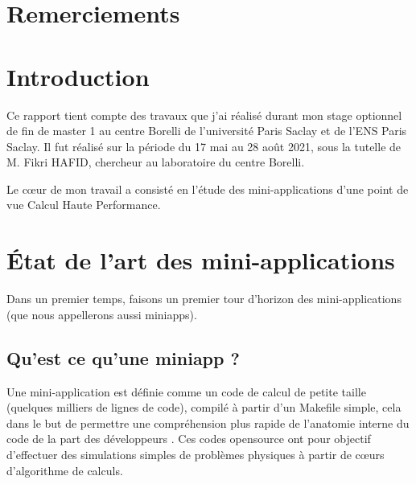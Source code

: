 \documentclass[11pt,a4paper,oneside]{memoir}
\theoremstyle{definition}
\theoremstyle{remark}
\theoremstyle{plain}
\begin{document}
\newpage
\tableofcontents



\begin{vplace}[0.5]

\chapter*{Remerciements}





\chapter*{Introduction}

Ce rapport tient compte des travaux que j'ai réalisé durant mon stage optionnel de fin de master 1 au centre Borelli de l'université Paris Saclay et de l'ENS Paris Saclay. Il fut réalisé sur la période du 17 mai au 28 août 2021, sous la tutelle de M. Fikri HAFID, chercheur au laboratoire du centre Borelli. \bigskip
~\bigskip


Le cœur de mon travail a consisté en l'étude des mini-applications d'une point de vue Calcul Haute Performance.



\end{vplace}







\newpage


\chapter{\'Etat de l'art des mini-applications}

Dans un premier temps, faisons un premier tour d'horizon des mini-applications (que nous appellerons aussi miniapps).

\section{Qu'est ce qu'une miniapp ?}

Une mini-application est définie comme un code de calcul de petite taille (quelques milliers de lignes de code), compilé à partir d'un Makefile simple, cela dans le but de permettre une compréhension plus rapide de l'anatomie interne du code de la part des développeurs \cite{sandia2009}. Ces codes opensource ont pour objectif d'effectuer des simulations simples de problèmes physiques à partir de cœurs d'algorithme de calculs.
\end{document}
